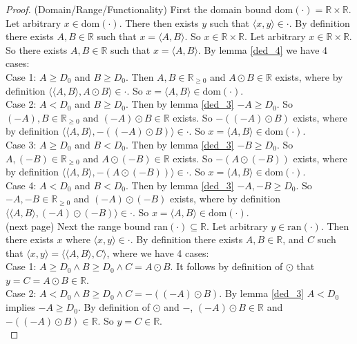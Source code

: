 \documentclass{report}
\begin{document}
\begin{proof}(Domain/Range/Functionality)
First the domain bound dom$(\cdot)=\mathbb R\times\mathbb R$. Let arbitrary $x\in\text{dom}(\cdot)$. There then exists $y$ such that $\langle x,y\rangle\in\cdot$. 
By definition there exists $A,B\in\mathbb R$ such that $x=\langle A,B\rangle$. So $x\in\mathbb R\times\mathbb R$. Let arbitrary $x\in\mathbb R\times\mathbb R$. So there exists $A,B\in\mathbb R$ such that $x=\langle A,B\rangle$.
By lemma \ref{ded_4} we have 4 cases:\\
\indent Case 1: $A\geq D_0$ and $B\geq D_0$. Then $A,B\in\mathbb R_{\geq0}$ and $A\odot B\in\mathbb R$ exists, where by definition $\langle\langle A,B\rangle,A\odot B\rangle\in\cdot$.
So $x=\langle A,B\rangle\in\text{dom}(\cdot)$.\\
\indent Case 2: $A<D_0$ and $B\geq D_0$. Then by lemma \ref{ded_3} $-A\geq D_0$. So $(-A),B\in\mathbb R_{\geq0}$ and $(-A)\odot B\in\mathbb R$ exists. So $-((-A)\odot B)$ exists, where by definition
$\langle\langle A,B\rangle,-((-A)\odot B)\rangle\in\cdot$. So $x=\langle A,B\rangle\in\text{dom}(\cdot)$.\\
\indent Case 3: $A\geq D_0$ and $B<D_0$. Then by lemma \ref{ded_3} $-B\geq D_0$. So $A,(-B)\in\mathbb R_{\geq0}$ and $A\odot(-B)\in\mathbb R$ exists. So $-(A\odot(-B))$ exists, where by definition
$\langle\langle A,B\rangle,-(A\odot(-B))\rangle\in\cdot$. So $x=\langle A,B\rangle\in\text{dom}(\cdot)$.\\
\indent Case 4: $A<D_0$ and $B<D_0$. Then by lemma \ref{ded_3} $-A,-B\geq D_0$. So $-A,-B\in\mathbb R_{\geq0}$ and $(-A)\odot(-B)$ exists, where by definition 
$\langle\langle A,B\rangle,(-A)\odot(-B)\rangle\in\cdot$. So $x=\langle A,B\rangle\in\text{dom}(\cdot)$.\\
(next page)\newpage
\indent Next the range bound ran$(\cdot)\subseteq\mathbb R$. Let arbitrary $y\in\text{ran}(\cdot)$.
Then there exists $x$ where $\langle x,y\rangle\in\cdot$. By definition there exists $A,B\in\mathbb R$, and $C$ such that 
$\langle x,y\rangle=\langle\langle A,B\rangle,C\rangle$, where we have 4 cases:\\
\indent Case 1: $A\geq D_0\land B\geq D_0\land C=A\odot B$. It follows by definition of $\odot$ that $y=C=A\odot B\in\mathbb R$.\\
\indent Case 2: $A<D_0\land B\geq D_0\land C=-((-A)\odot B)$. By lemma \ref{ded_3} $A<D_0$ implies $-A\geq D_0$. By definition of $\odot$ and $-$, $(-A)\odot B\in\mathbb R$ and 
$-((-A)\odot B)\in\mathbb R$. So $y=C\in\mathbb R$.\\

\end{proof}
\end{document}
